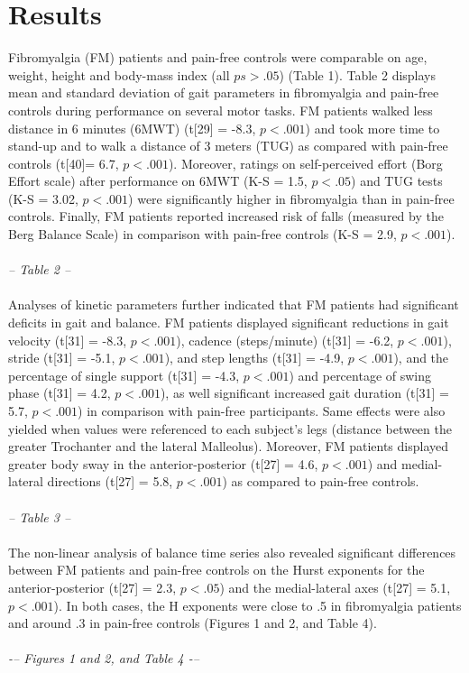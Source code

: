 \documentclass[12pt]{article}
\begin{document}
\section*{Results}

Fibromyalgia (FM) patients and pain-free controls were comparable on age, weight, height and body-mass index (all $ps > .05$) (Table 1). Table 2 displays mean and standard deviation of gait parameters in fibromyalgia and pain-free controls during performance on several motor tasks. FM patients walked less distance in 6 minutes (6MWT) (t[29] = -8.3, $p < .001$) and took more time to stand-up and to walk a distance of 3 meters (TUG) as compared with pain-free controls (t[40]= 6.7, $p < .001$). Moreover, ratings on self-perceived effort (Borg Effort scale) after performance on 6MWT (K-S = 1.5, $p < .05$) and TUG tests (K-S = 3.02, $p < .001$) were significantly higher in fibromyalgia than in pain-free controls. Finally, FM patients reported increased risk of falls (measured by the Berg Balance Scale) in comparison with pain-free controls (K-S = 2.9, $p < .001$).\\
\\
\emph{-- Table 2 --}\\
\\

Analyses of kinetic parameters further indicated that FM patients had significant deficits in gait and balance. FM patients displayed significant reductions in gait velocity (t[31] = -8.3, $p < .001$), cadence (steps/minute) (t[31] = -6.2, $p < .001$), stride (t[31] = -5.1, $p < .001$), and step lengths (t[31] = -4.9, $p < .001$), and the percentage of single support (t[31] = -4.3, $p < .001$) and percentage of swing phase (t[31] = 4.2, $p < .001$), as well significant increased gait duration (t[31] = 5.7, $p < .001$) in comparison with pain-free participants. Same effects were also yielded when values were referenced to each subject’s legs (distance between the greater Trochanter and the lateral Malleolus). Moreover, FM patients displayed greater body sway in the anterior-posterior (t[27] = 4.6, $p < .001$) and medial-lateral directions (t[27] = 5.8, $p < .001$) as compared to pain-free controls.\\
\\
\emph{-- Table 3 --}\\
\\
The non-linear analysis of balance time series also revealed significant differences between FM patients and pain-free controls on the Hurst exponents for the anterior-posterior (t[27] = 2.3, $p < .05$) and the medial-lateral axes (t[27] = 5.1, $p < .001$). In both cases, the H exponents were close to .5 in fibromyalgia patients and around .3 in pain-free controls (Figures 1 and 2, and Table 4).\\
\\
\emph{-– Figures 1 and 2, and Table 4 -–}\\
\end{document}
